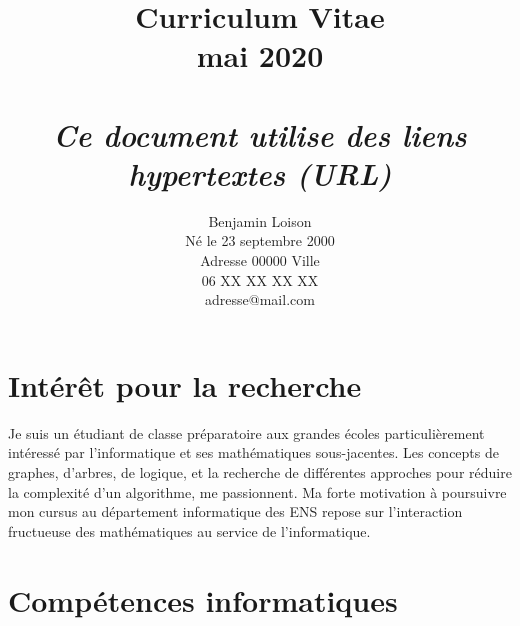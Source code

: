 \documentclass{article}
\makeatletter
\renewcommand{\maketitle}
{
	\bgroup\setlength{\parindent}{0pt}
	\begin{flushleft}\textbf{\@author}\end{flushleft}
	\begin{center}\huge\@title\end{center}
}
\makeatother
\begin{document}
	\author{Benjamin Loison\\
	
		Né le 23 septembre 2000\\
		Adresse 00000 Ville\\
		06 XX XX XX XX\\
	
	adresse@mail.com}
	\title{Curriculum Vitae\\ %
	
		\Large mai 2020\\
	
	\normalsize\textit{\\
		\color{blue}Ce document utilise des liens hypertextes (URL)
	}}
	
	\maketitle

	\def\contentsname{\empty}

		\section{Intérêt pour la recherche}

			Je suis un étudiant de classe préparatoire aux grandes écoles particulièrement intéressé par l’informatique et ses mathématiques sous-jacentes. Les concepts de graphes, d’arbres, de logique, et la recherche de différentes approches pour réduire la complexité d’un algorithme, me passionnent. Ma forte motivation à poursuivre mon cursus au département informatique des ENS repose sur l’interaction fructueuse des mathématiques au service de l’informatique.%

		\section{Compétences informatiques}
  
\end{document}

